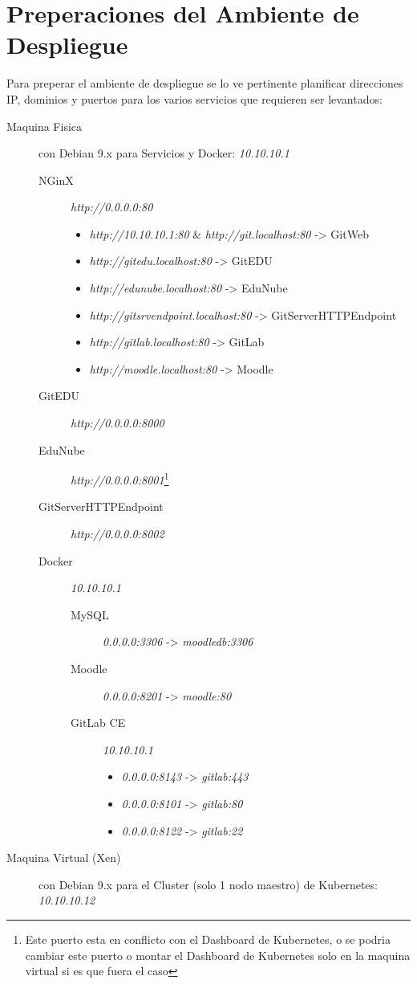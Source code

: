 \section{Preperaciones del Ambiente de Despliegue}
Para preperar el ambiente de despliegue se lo ve pertinente planificar direcciones IP, dominios y puertos para los varios servicios que requieren ser levantados:
\begin{description}
	\item[Maquina Fisica] con Debian 9.x para Servicios y Docker: \textit{10.10.10.1}
    \begin{description}
    	\item[NGinX] \textit{http://0.0.0.0:80}
        \begin{itemize}
            \item \textit{http://10.10.10.1:80} \& \textit{http://git.localhost:80} -> GitWeb
            \item \textit{http://gitedu.localhost:80} -> GitEDU
            \item \textit{http://edunube.localhost:80} -> EduNube
            \item \textit{http://gitsrvendpoint.localhost:80} -> GitServerHTTPEndpoint
            \item \textit{http://gitlab.localhost:80} -> GitLab
            \item \textit{http://moodle.localhost:80} -> Moodle
        \end{itemize}
        \item[GitEDU] \textit{http://0.0.0.0:8000}
        \item[EduNube] \textit{http://0.0.0.0:8001}\footnote{Este puerto esta en conflicto con el Dashboard de Kubernetes, o se podria cambiar este puerto o montar el Dashboard de Kubernetes solo en la maquina virtual si es que fuera el caso}
        \item[GitServerHTTPEndpoint] \textit{http://0.0.0.0:8002}
        \item[Docker] \textit{10.10.10.1}
        \begin{description}
        	\item[MySQL] \textit{0.0.0.0:3306} -> \textit{moodledb:3306}
        	\item[Moodle] \textit{0.0.0.0:8201} -> \textit{moodle:80}
        	\item[GitLab CE] \textit{10.10.10.1}
            \begin{itemize}
            	\item \textit{0.0.0.0:8143} -> \textit{gitlab:443}
            	\item \textit{0.0.0.0:8101} -> \textit{gitlab:80}
            	\item \textit{0.0.0.0:8122} -> \textit{gitlab:22}
            \end{itemize}
        \end{description}
    \end{description}
    \item[Maquina Virtual (Xen)] con Debian 9.x para el Cluster (solo 1 nodo maestro) de Kubernetes: \textit{10.10.10.12}
\end{description}

